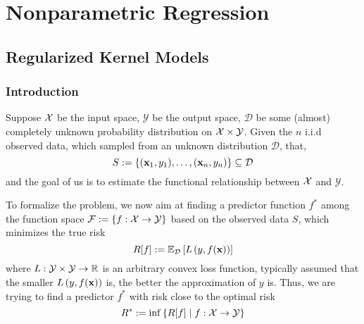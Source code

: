 \chapter{Nonparametric Regression}

\section{Regularized Kernel Models}

\subsection{Introduction}

Suppose \(\mathcal{X}\) be the input space, \(\mathcal{Y}\) be the output space, \(\mathcal{D}\) be some (almost) completely unknown probability distribution on \(\mathcal{X}\times\mathcal{Y}\). Given the \(n\) i.i.d observed data, which sampled from an unknown distribution \(\mathcal{D}\), that,
\begin{equation}
	S:=\left\{(\mathbf{x}_{1},y_{1}),\ldots,(\mathbf{x}_{n},y_{n})\right\}\subseteq\mathcal{D}
\end{equation}
and the goal of us is to estimate the functional relationship between \(\mathcal{X}\) and \(\mathcal{Y}\).

To formalize the problem, we now aim at finding a predictor function \(f^{*}\) among the function space \(\mathcal{F}:=\left\{f:\mathcal{X}\rightarrow\mathcal{Y}\right\}\) based on the observed data \(S\), which minimizes the true risk
\begin{equation} \label{eq:true-risk}
	R[f]:=\mathbb{E}_{\mathcal{D}}\left[L\left(y,f(\mathbf{x})\right)\right]
\end{equation}
where \(L:\mathcal{Y}\times\mathcal{Y}\rightarrow\mathbb{R}\) is an arbitrary convex loss function, typically assumed that the smaller \(L\left(y,f(\mathbf{x})\right)\) is, the better the approximation of \(y\) is. Thus, we are trying to find a predictor \(f^{*}\) with risk close to the optimal risk
\begin{equation}
	R^{*}:=\inf\left\{R[f]\mid f:\mathcal{X}\rightarrow\mathcal{Y}\right\}
\end{equation}

